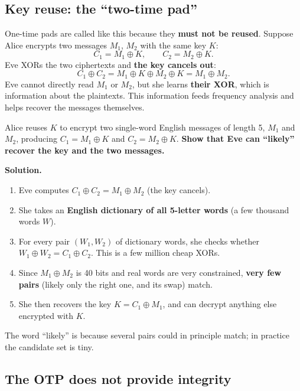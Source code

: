 \subsection{Key reuse: the ``two-time pad''}

One-time pads are called like this because they \textbf{must not be reused}. Suppose Alice encrypts two messages $M_1$, $M_2$ with the same key $K$:
\[
C_1 = M_1 \oplus K, \qquad C_2 = M_2 \oplus K.
\]
Eve XORs the two ciphertexts and \textbf{the key cancels out}:
\[
\boxed{C_1 \oplus C_2 = M_1 \oplus K \oplus M_2 \oplus K = M_1 \oplus M_2.}
\]
Eve cannot directly read $M_1$ or $M_2$, but she learns \textbf{their XOR}, which is information about the plaintexts. This information feeds frequency analysis and helps recover the messages themselves.

\begin{example}
Alice reuses $K$ to encrypt two single-word English messages of length 5, $M_1$ and $M_2$, producing $C_1 = M_1 \oplus K$ and $C_2 = M_2 \oplus K$. \textbf{Show that Eve can ``likely'' recover the key and the two messages.}

\textbf{Solution.}
\begin{enumerate}
    \item Eve computes $C_1 \oplus C_2 = M_1 \oplus M_2$ (the key cancels).
    \item She takes an \textbf{English dictionary of all 5-letter words} (a few thousand words $W$).
    \item For every pair $(W_1, W_2)$ of dictionary words, she checks whether $W_1 \oplus W_2 = C_1 \oplus C_2$. This is a few million cheap XORs.
    \item Since $M_1 \oplus M_2$ is 40 bits and real words are very constrained, \textbf{very few pairs} (likely only the right one, and its swap) match.
    \item She then recovers the key $K = C_1 \oplus M_1$, and can decrypt anything else encrypted with $K$.
\end{enumerate}
The word ``likely'' is because several pairs could in principle match; in practice the candidate set is tiny.
\end{example}

\subsection{The OTP does not provide integrity}

\begin{center}
\end{center}


